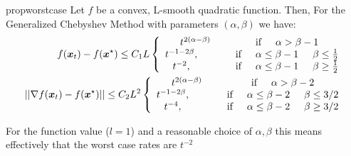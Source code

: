 \documentclass{article}
\begin{document}
\begin{restatable}{prop}{worstcase}
Let $f$ be a convex, L-smooth quadratic function. Then, For the Generalized Chebyshev Method with parameters $(\alpha,\beta)$ we have:
\begin{align}
 f({\boldsymbol x}_t)-f({\boldsymbol x}^\star) \leq C_1L\left\{
    \begin{array}{cc}
           t^{2(\alpha-\beta)} &\text{if} \hspace{0.5 cm} \alpha>\beta-1 \\
         t^{-1-2\beta}, \hspace{1 cm} &\text{if} \hspace{0.5 cm} \alpha\leq \beta-1\hspace{0.5 cm} \beta\leq \frac{1}{2}\\
         t^{-2}, \hspace{1 cm} &\text{if} \hspace{0.5 cm} \alpha\leq\beta-1\hspace{0.5 cm} \beta\geq \frac{1}{2} 
    \end{array}
    \right .\\
    ||\nabla f({\boldsymbol x}_t)-f({\boldsymbol x}^\star)||\leq C_2L^2\left\{
    \begin{array}{cc}
           t^{2(\alpha-\beta)} &\text{if} \hspace{0.5 cm} \alpha>\beta-2 \\
         t^{-1-2\beta}, \hspace{1 cm} &\text{if} \hspace{0.5 cm} \alpha\leq \beta-2\hspace{0.5 cm} \beta\leq 3/2\\
         t^{-4}, \hspace{1 cm} &\text{if} \hspace{0.5 cm} \alpha\leq\beta-2\hspace{0.5 cm} \beta\geq 3/2
    \end{array}
    \right . 
\end{align}
\end{restatable}


For the function value ($l=1$) and a reasonable choice of $\alpha,\beta$ this means effectively that the worst case rates are $t^{-2}$ 
\end{document}
